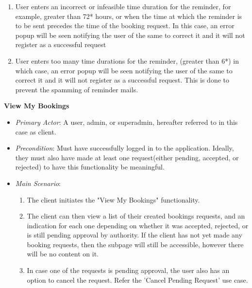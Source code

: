 \documentclass{article}
\begin{document}
\begin{itemize}
\begin{enumerate}
        \item User enters an incorrect or infeasible time duration for the reminder, for example, greater than 72* hours, or when the time at which the reminder is to be sent precedes the time of the booking request. In this case, an error popup will be seen notifying the user of the same to correct it and it will not register as a successful request
        \item User enters too many time durations for the reminder, (greater than 6*) in which case, an error popup will be seen notifying the user of the same to correct it and it will not register as a successful request. This is done to prevent the spamming of reminder mails.
    \end{enumerate}
\end{itemize}

\textbf{View My Bookings}
\label{ucviewmybookings}
\begin{itemize}
    \item \textit{Primary Actor}: A user, admin, or superadmin, hereafter referred to in this case as client. 
    \item \textit{Precondition}: Must have successfully logged in to the application. Ideally, they must also have made at least one request(either pending, accepted, or rejected) to have this functionality be meaningful. 
   \item \textit{Main Scenario}:
   \begin{enumerate}
       \item The client initiates the "View My Bookings" functionality. 
       \item The client can then view a list of their created bookings requests, and an indication for each one depending on whether it was accepted, rejected, or is still pending approval by authority. If the client has not yet made any booking requests, then the subpage will still be accessible, however there will be no content on it. 
       \item In case one of the requests is pending approval, the user also has an option to cancel the request. Refer the 'Cancel Pending Request' use case.
   \end{enumerate}
\end{itemize}
\end{document}
